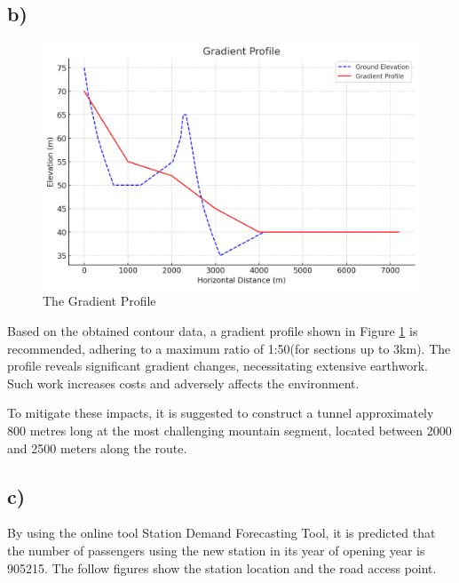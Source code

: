 \documentclass[letterpaper,12pt,leqno]{article}
\begin{document}
	\subsection{b)}\label{b}
	\begin{figure}[H]
		\centering
		\includegraphics[width=0.6\linewidth]{figure/gradient.png}
		\caption{The Gradient Profile}
		\label{fig:gradient}
	\end{figure}
	Based on the obtained contour data, a gradient profile shown in Figure \ref{fig:gradient} is
	recommended, adhering to a maximum ratio of 1:50(for sections up to
	3km). The profile reveals significant gradient changes, necessitating
	extensive earthwork. Such work increases costs and adversely affects the
	environment.
	
	To mitigate these impacts, it is suggested to construct a tunnel
	approximately 800 metres long at the most challenging mountain segment,
	located between 2000 and 2500 meters along the route.
	
	\subsection{c)}\label{c}
	
	By using the online tool Station Demand Forecasting Tool, it is
	predicted that the number of passengers using the new station in its
	year of opening year is 905215. The follow figures show the station
	location and the road access point.
	
\end{document}
